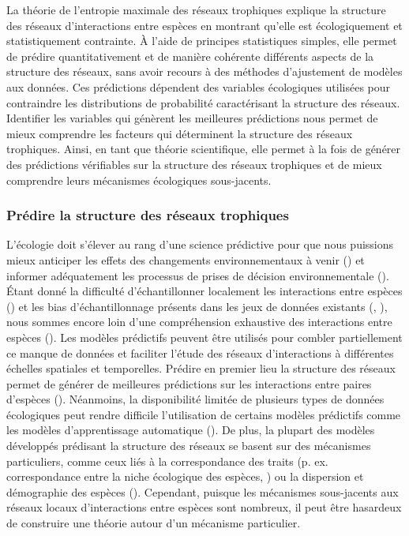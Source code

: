 La théorie de l'entropie maximale des réseaux trophiques explique la structure
des réseaux d'interactions entre espèces en montrant qu'elle est écologiquement
et statistiquement contrainte. À l'aide de principes statistiques simples, elle
permet de prédire quantitativement et de manière cohérente différents aspects de
la structure des réseaux, sans avoir recours à des méthodes d'ajustement de
modèles aux données. Ces prédictions dépendent des variables écologiques
utilisées pour contraindre les distributions de probabilité caractérisant la
structure des réseaux. Identifier les variables qui génèrent les meilleures
prédictions nous permet de mieux comprendre les facteurs qui déterminent la
structure des réseaux trophiques. Ainsi, en tant que théorie scientifique, elle
permet à la fois de générer des prédictions vérifiables sur la structure des
réseaux trophiques et de mieux comprendre leurs mécanismes écologiques
sous-jacents. 

\subsubsection{Prédire la structure des réseaux trophiques} 

L'écologie doit s'élever au rang d'une science prédictive pour que nous
puissions mieux anticiper les effets des changements environnementaux à venir
(\cite{Evans2012Predictive}) et informer adéquatement les processus de prises de
décision environnementale (\cite{Clark2001Ecological}). Étant donné la
difficulté d'échantillonner localement les interactions entre espèces
(\cite{Jordano2016Sampling}) et les bias d'échantillonnage présents dans les
jeux de données existants (\cite{Aguiar2019Revealing}, \cite{Poisot2021Global}),
nous sommes encore loin d'une compréhension exhaustive des interactions entre
espèces (\cite{Hortal2015Seven}). Les modèles prédictifs peuvent être utilisés
pour combler partiellement ce manque de données et faciliter l'étude des réseaux
d'interactions à différentes échelles spatiales et temporelles. Prédire en
premier lieu la structure des réseaux permet de générer de meilleures
prédictions sur les interactions entre paires d'espèces
(\cite{Strydom2021Roadmapa}). Néanmoins, la disponibilité limitée de plusieurs
types de données écologiques peut rendre difficile l'utilisation de certains
modèles prédictifs comme les modèles d'apprentissage automatique
(\cite{Strydom2021Roadmapa}).  De plus, la plupart des modèles développés
prédisant la structure des réseaux se basent sur des mécanismes particuliers,
comme ceux liés à la correspondance des traits (p. ex. correspondance entre la
niche écologique des espèces, \cite{Williams2000Simple}) ou la dispersion et
démographie des espèces (\cite{Canard2012Emergence}). Cependant, puisque les
mécanismes sous-jacents aux réseaux locaux d'interactions entre espèces sont
nombreux, il peut être hasardeux de construire une théorie autour d'un mécanisme
particulier. 

